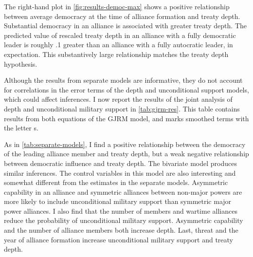 \documentclass[12pt]{article}
\begin{document}
The right-hand plot in \autoref{fig:results-democ-max} shows a positive relationship between average democracy at the time of alliance formation and treaty depth.
Substantial democracy in an alliance is associated with greater treaty depth. 
The predicted value of rescaled treaty depth in an alliance with a fully democratic leader is roughly .1 greater than an alliance with a fully autocratic leader, in expectation. 
This substantively large relationship matches the treaty depth hypothesis.


Although the results from separate models are informative, they do not account for correlations in the error terms of the depth and unconditional support models, which could affect inferences. 
I now report the results of the joint analysis of depth and unconditional military support in \autoref{tab:gjrm-res}. 
This table contains results from both equations of the GJRM model, and marks smoothed terms with the letter s. 


As in \autoref{tab:separate-models}, I find a positive relationship between the democracy of the leading alliance member and treaty depth, but a weak negative relationship between democratic influence and treaty depth. 
The bivariate model produces similar inferences. 
The control variables in this model are also interesting and somewhat different from the estimates in the separate models.  
Asymmetric capability in an alliance and symmetric alliances between non-major powers are more likely to include unconditional military support than symmetric major power alliances. 
I also find that the number of members and wartime alliances reduce the probability of unconditional military support. 
Asymmetric capability and the number of alliance members both increase depth. 
Last, threat and the year of alliance formation increase unconditional military support and treaty depth. 
\end{document}
